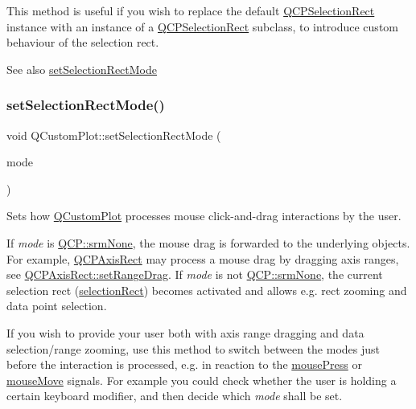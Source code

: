 This method is useful if you wish to replace the default \mbox{\hyperlink{class_q_c_p_selection_rect}{Q\+C\+P\+Selection\+Rect}} instance with an instance of a \mbox{\hyperlink{class_q_c_p_selection_rect}{Q\+C\+P\+Selection\+Rect}} subclass, to introduce custom behaviour of the selection rect.

\begin{DoxySeeAlso}{See also}
\mbox{\hyperlink{class_q_custom_plot_a810ef958ebe84db661c7288b526c0deb}{set\+Selection\+Rect\+Mode}} 
\end{DoxySeeAlso}
\mbox{\label{class_q_custom_plot_a810ef958ebe84db661c7288b526c0deb}} 
\subsubsection{\texorpdfstring{setSelectionRectMode()}{setSelectionRectMode()}}
{\footnotesize\ttfamily void Q\+Custom\+Plot\+::set\+Selection\+Rect\+Mode (\begin{DoxyParamCaption}\item[{\mbox{\hyperlink{namespace_q_c_p_ac9aa4d6d81ac76b094f9af9ad2d3aacf}{Q\+C\+P\+::\+Selection\+Rect\+Mode}}}]{mode }\end{DoxyParamCaption})}

Sets how \mbox{\hyperlink{class_q_custom_plot}{Q\+Custom\+Plot}} processes mouse click-\/and-\/drag interactions by the user.

If {\itshape mode} is \mbox{\hyperlink{namespace_q_c_p_ac9aa4d6d81ac76b094f9af9ad2d3aacfa9032f170490d67240a6c68c2638ffab1}{Q\+C\+P\+::srm\+None}}, the mouse drag is forwarded to the underlying objects. For example, \mbox{\hyperlink{class_q_c_p_axis_rect}{Q\+C\+P\+Axis\+Rect}} may process a mouse drag by dragging axis ranges, see \mbox{\hyperlink{class_q_c_p_axis_rect_ae6aef2f7211ba6097c925dcd26008418}{Q\+C\+P\+Axis\+Rect\+::set\+Range\+Drag}}. If {\itshape mode} is not \mbox{\hyperlink{namespace_q_c_p_ac9aa4d6d81ac76b094f9af9ad2d3aacfa9032f170490d67240a6c68c2638ffab1}{Q\+C\+P\+::srm\+None}}, the current selection rect (\mbox{\hyperlink{class_q_custom_plot_ad7df2bcbba307e644db383b449e31efd}{selection\+Rect}}) becomes activated and allows e.\+g. rect zooming and data point selection.

If you wish to provide your user both with axis range dragging and data selection/range zooming, use this method to switch between the modes just before the interaction is processed, e.\+g. in reaction to the \mbox{\hyperlink{class_q_custom_plot_aca75bf9afb5dd19349c375de2a87a051}{mouse\+Press}} or \mbox{\hyperlink{class_q_custom_plot_a742ca4f94688bed2a685fd8a56ce5704}{mouse\+Move}} signals. For example you could check whether the user is holding a certain keyboard modifier, and then decide which {\itshape mode} shall be set.

